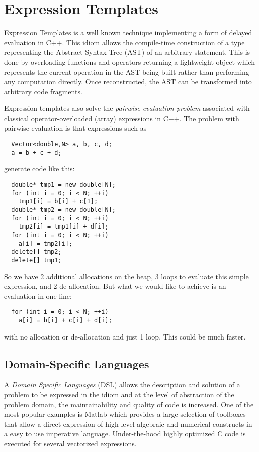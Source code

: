 \chapter{Expression Templates}
Expression Templates is a well known technique implementing a form of delayed evaluation in C++. This idiom allows the compile-time
construction of a type representing the Abstract Syntax Tree (AST) of an arbitrary statement. This is done by overloading functions and
operators returning a lightweight object which represents the current operation in the AST being built rather than performing any
computation directly. Once reconstructed, the AST can be transformed into arbitrary code fragments.

Expression templates also solve the \textit{pairwise evaluation problem} associated with classical operator-overloaded (array) expressions
in C++. The problem with pairwise evaluation is that expressions such as
%
\begin{verbatim}
  Vector<double,N> a, b, c, d;
  a = b + c + d;
\end{verbatim}
%
generate code like this:
%
\begin{verbatim}
  double* tmp1 = new double[N];
  for (int i = 0; i < N; ++i)
    tmp1[i] = b[i] + c[1];
  double* tmp2 = new double[N];
  for (int i = 0; i < N; ++i)
    tmp2[i] = tmp1[i] + d[i];
  for (int i = 0; i < N; ++i)
    a[i] = tmp2[i];
  delete[] tmp2;
  delete[] tmp1;
\end{verbatim}

So we have 2 additional allocations on the heap, 3 loops to evaluate this simple expression, and 2 de-allocation. But what we would like to
achieve is an evaluation in one line:
%
\begin{verbatim}
  for (int i = 0; i < N; ++i)
    a[i] = b[i] + c[i] + d[i];
\end{verbatim}
%
with no allocation or de-allocation and just 1 loop. This could be much faster.


\section{Domain-Specific Languages}
A \emph{Domain Specific Languages} (DSL) allows the description and solution of a problem to be
expressed in the idiom and at the level of abstraction of the problem domain, the
maintainability and quality of code is increased. One of the most popular examples
is \textsf{Matlab} which provides a large selection of toolboxes that allow a direct
expression of high-level algebraic and numerical constructs in a easy to use imperative
language. Under-the-hood highly optimized C code is executed for several vectorized expressions.

